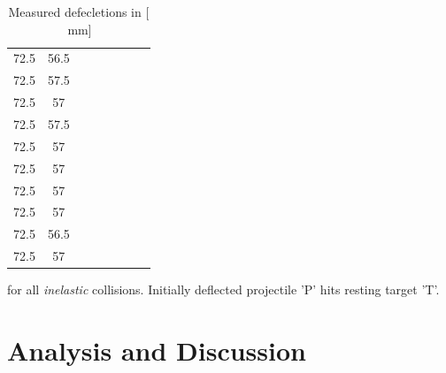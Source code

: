 \documentclass{scrreprt}
\newcommand{\unit}[1]{\ensuremath{\, \mathrm{#1}}}
\renewcommand{\emph}[1]{\textit{#1}}
\begin{document}
\begin{table}[H]
\begin{tabular}{ccp{1.5cm}ccp{1.5cm}cc}
     72.5 &         56.5 &            &            &            &            &            &            \\
     72.5 &         57.5 &            &            &            &            &            &            \\
     72.5 &         57 &            &            &            &            &            &            \\
     72.5 &         57.5 &            &            &            &            &            &            \\
     72.5 &         57 &            &            &            &            &            &            \\
     72.5 &         57 &            &            &            &            &            &            \\
     72.5 &         57 &            &            &            &            &            &            \\
     72.5 &         57 &            &            &            &            &            &            \\
     72.5 &         56.5 &            &            &            &            &            &            \\
     72.5 &         57 &            &            &            &            &            &            \\
\end{tabular}  
\caption{Measured defecletions in [$\unit{mm}$]} for all \emph{inelastic} collisions. Initially deflected projectile 'P' hits resting target 'T'.   
\end{table}

\section{Analysis and Discussion}
\end{document}
